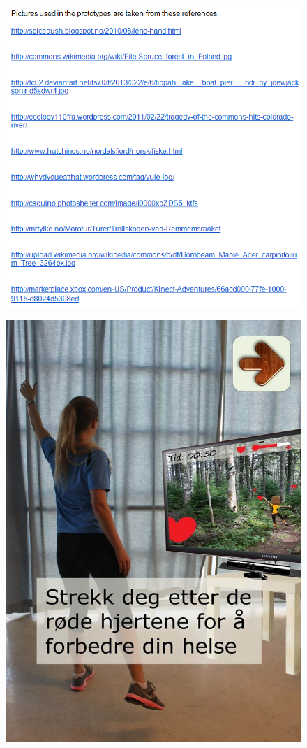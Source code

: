 \begin{figure} [H]
\centering
\includegraphics[scale=0.8]{kilderprototype}
\label{fig:kilder}
\end{figure}

\begin{figure} [H]
\centering
\includegraphics[scale=0.7]{KineIntro.jpg}
\label{fig:kineintroNorsk}
\end{figure}

